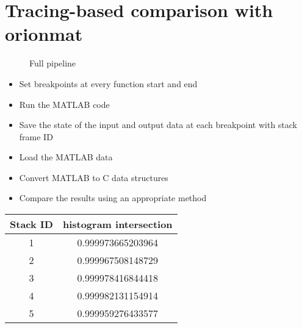 \section{Tracing-based comparison with \gls{orionmat}}

\begin{figure}
	\resizebox{0.8\linewidth}{!}{}
	\caption{Full pipeline}
\end{figure}

	\begin{itemize}
	\item Set breakpoints at every function start and end
	\item Run the MATLAB code
	\item Save the state of the input and output data at
		each breakpoint with stack frame ID
	\item Load the MATLAB data
	\item Convert MATLAB to C data structures
	\item Compare the results using an appropriate method
	\end{itemize}

\begin{table}
	\begin{tabular}{cc}
		\toprule
		\be{}Stack ID     & \be{} histogram intersection \\		   
		\midrule
		1 & 0.999973665203964 \\
		2 & 0.999967508148729 \\
		3 & 0.999978416844418 \\
		4 & 0.999982131154914 \\
		5 & 0.999959276433577 \\
		\bottomrule
	\end{tabular}
\end{table}


